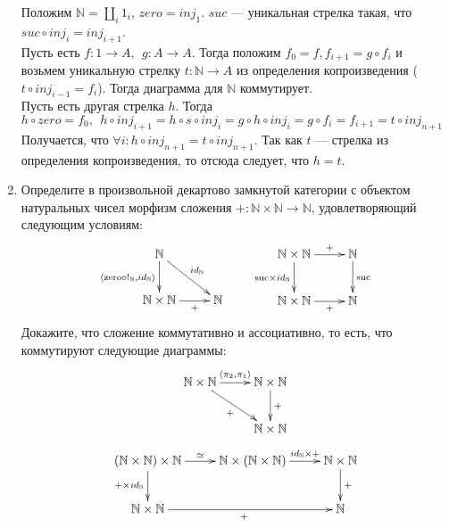 \documentclass[draft]{article}
\newcommand{\zero}{\mathrm{zero}}
\newcommand{\suc}{\mathrm{suc}}
\begin{document}
\begin{enumerate}
Положим $\mathbb{N} =  \amalg_i 1_i$, $zero = inj_1$. $suc$ --- уникальная стрелка такая, что $suc \circ inj_i = inj_{i + 1}$.\\
Пусть есть $f : 1 \to A, ~~g : A \to A$. Тогда положим $f_0 = f, f_{i + 1} = g \circ f_i$ и возьмем уникальную стрелку $t: \mathbb{N} \to A $ из определения копроизведения ($t \circ inj_{i - 1} = f_i$). Тогда диаграмма для $\mathbb{N} $ коммутирует.\\
Пусть есть другая стрелка $h$. Тогда $h \circ zero = f_0, ~~h \circ inj_{i + 1} = h \circ s \circ inj_i = g \circ h \circ inj_i = g \circ f_i = f_{i + 1} = t \circ inj_{n+1}$\\
Получается, что $\forall i: h \circ inj_{n+1} = t \circ inj_{n+1}$. Так как $t$ --- стрелка из определения копроизведения, то отсюда следует, что  $h = t$.
\item Определите в произвольной декартово замкнутой категории с объектом натуральных чисел морфизм сложения $+ : \mathbb{N} \times \mathbb{N} \to \mathbb{N}$, удовлетворяющий следующим условиям:
\[ \xymatrix{ \mathbb{N} \ar[d]_{\langle \zero \circ !_\mathbb{N}, id_\mathbb{N} \rangle} \ar[rd]^{id_\mathbb{N}} \\
              \mathbb{N} \times \mathbb{N} \ar[r]_-{+} & \mathbb{N}
            }
\qquad
   \xymatrix{ \mathbb{N} \times \mathbb{N} \ar[r]^-{+} \ar[d]_{\suc \times id_\mathbb{N}} & \mathbb{N} \ar[d]^{\suc} \\
              \mathbb{N} \times \mathbb{N} \ar[r]_-{+} & \mathbb{N}
            } \]
Докажите, что сложение коммутативно и ассоциативно, то есть, что коммутируют следующие диаграммы:
\[ \xymatrix{ \mathbb{N} \times \mathbb{N} \ar[r]^{\langle \pi_2, \pi_1 \rangle} \ar[rd]_{+} & \mathbb{N} \times \mathbb{N} \ar[d]^{+} \\
                                                                           & \mathbb{N} \times \mathbb{N}
            } \]
\[ \xymatrix{ (\mathbb{N} \times \mathbb{N}) \times \mathbb{N} \ar[r]^{\simeq} \ar[d]_{+ \times id_\mathbb{N}} & \mathbb{N} \times (\mathbb{N} \times \mathbb{N}) \ar[r]^-{id_\mathbb{N} \times +} & \mathbb{N} \times \mathbb{N} \ar[d]^{+} \\
              \mathbb{N} \times \mathbb{N} \ar[rr]_{+} & & \mathbb{N}
            } \]

\end{enumerate}
\end{document}
